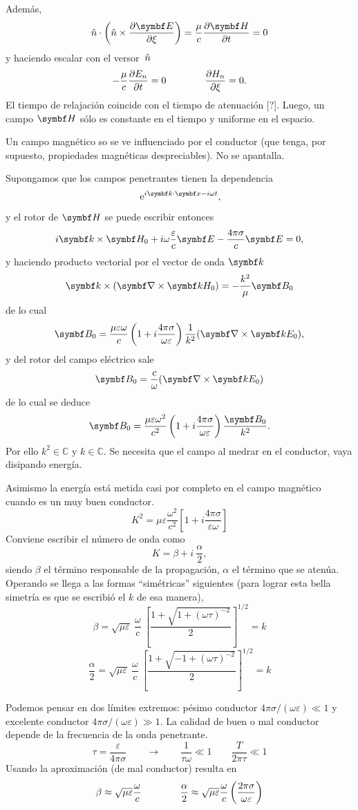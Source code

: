 \documentclass[10pt,oneside]{CBFT_book}
\begin{document}
Además,
\[
	\hat{n} \cdot \left( \hat{n} \times \dpar{\vb{E}}{\xi} \right) =
	\frac{\mu}{c} \dpar{ \vb{H} }{t} = 0
\]
y haciendo escalar con el versor $\:\hat{n}$
\[
	- \frac{\mu}{c}\frac{\partial^{\hspace{-0.05em}} {E_n}}{\partial {t}^{\hspace{-0.05em}}} = 0  \qquad \qquad \frac{\partial^{\hspace{-0.05em}} {H_n}}{\partial {\xi}^{\hspace{-0.05em}}} = 0.
\]
El tiempo de relajación coincide con el tiempo de atenuación [?].
Luego, un campo $\vb{H}$ sólo es constante en el tiempo y uniforme en el espacio.

Un campo magnético so se ve influenciado por el conductor (que tenga, por supuesto,
propiedades magnéticas despreciables). No se apantalla. 

Supongamos que los campos penetrantes tienen la dependencia
\[
	\euler^{i \pe{k}{x} - i \omega t},
\]
y el rotor de $\vb{H}$ se puede escribir entonces
\[
	i \pv{k}{H_0} + i \omega \frac{\varepsilon}{c} \vb{E} - \frac{4 \pi \sigma }{c} \vb{E} = 0,
\]
y haciendo producto vectorial por el vector de onda $\vb{k}$
\[
	\vb{k}\times (\rotorm{k}{H_0}) = - \frac{k^2}{\mu} \vb{B}_0
\]
de lo cual
\[
	\vb{B}_0 =\frac{\mu \varepsilon \omega }{ c} 
	\left( 1 + i \frac{4\pi\sigma}{\omega\varepsilon}\right) 
	\frac{1}{k^2} (\rotorm{k}{E_0}),
\]
y del rotor del campo eléctrico sale
\[
	\vb{B}_0 = \frac{c}{\omega} (\rotorm{k}{E_0})
\]
de lo cual se deduce
\[
	\vb{B}_0 =\frac{\mu \varepsilon \omega^2 }{ c^2 } 
	\left( 1 + i \frac{4\pi\sigma}{\omega\varepsilon}\right) 
	\frac{\vb{B}_0}{k^2}.
\]
Por ello $ k^2 \in \mathbb{C}$ y $k \in \mathbb{C} $. Se necesita que el campo al medrar en el conductor,
vaya disipando energía. 

Asimismo la energía está metida casi por completo en el campo magnético cuando es un muy buen conductor.
\[
	K^2 = \mu \varepsilon \frac{\omega^2}{c^2} \left[ 1 + i\frac{4\pi\sigma}{\varepsilon \omega} \right]
\]
Conviene escribir el número de onda como
\[
	K = \beta + i \: \frac{\alpha}{2},
\]
siendo $\beta$ el término responsable de la propagación, $\alpha$ el término que se atenúa. 
Operando se llega a las formas ``simétricas'' siguientes (para lograr esta bella simetría es que se
escribió el $k$ de esa manera),
\[
	\beta = \sqrt{ \mu \varepsilon } \: \frac{\omega}{c} \:
	\left[ \frac{1 + \sqrt{ 1 + (\omega\tau )^{-2}}}{2}\right]^{1/2} = k
\]
\[
	\frac{\alpha}{2} = \sqrt{ \mu \varepsilon } \: \frac{\omega}{c} \:
	\left[ \frac{1 + \sqrt{ -1 + (\omega\tau )^{-2}}}{2}\right]^{1/2} = k
\]

Podemos pensar en dos límites extremos: pésimo conductor $ 4 \pi \sigma / (\omega \varepsilon ) \ll 1 $ 
y excelente conductor $ 4 \pi \sigma / (\omega \varepsilon ) \gg 1 $.
La calidad de buen o mal conductor depende de la frecuencia de la onda penetrante.
\[
	\tau = \frac{\varepsilon}{4\pi\sigma} \qquad \rightarrow \qquad 
	\frac{1}{\tau \omega } \ll 1 \qquad \frac{T}{2\pi\tau} \ll 1
\]
Usando la aproximación (de mal conductor) resulta en
\[
	\beta \approx \sqrt{ \mu \varepsilon } \frac{\omega}{c} \qquad \qquad 
	\frac{\alpha}{2} \approx \sqrt{ \mu \varepsilon } \frac{\omega}{c} 
	\left( \frac{  2 \pi \sigma  }{ \omega \varepsilon  } \right)
\]
\end{document}
